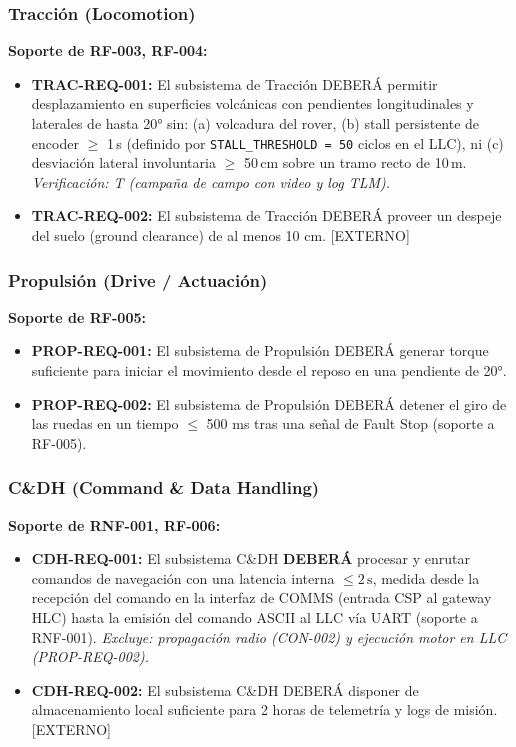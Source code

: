 \subsubsection{Tracción (Locomotion)}
\textbf{Soporte de RF-003, RF-004:}
\begin{itemize}
    \item \textbf{TRAC-REQ-001:} El subsistema de Tracción DEBERÁ permitir desplazamiento en superficies volcánicas con pendientes longitudinales y laterales de hasta 20° sin: (a) volcadura del rover, (b) stall persistente de encoder $\ge$ 1\,s (definido por \texttt{STALL\_THRESHOLD = 50} ciclos en el LLC), ni (c) desviación lateral involuntaria $\ge$ 50\,cm sobre un tramo recto de 10\,m. \emph{Verificación: T (campaña de campo con video y log TLM).}
    \item \textbf{TRAC-REQ-002:} El subsistema de Tracción DEBERÁ proveer un despeje del suelo (ground clearance) de al menos 10 cm. [EXTERNO]
\end{itemize}

\subsubsection{Propulsión (Drive / Actuación)}
\textbf{Soporte de RF-005:}
\begin{itemize}
    \item \textbf{PROP-REQ-001:} El subsistema de Propulsión DEBERÁ generar torque suficiente para iniciar el movimiento desde el reposo en una pendiente de 20°.
    \item \textbf{PROP-REQ-002:} El subsistema de Propulsión DEBERÁ detener el giro de las ruedas en un tiempo $\le$ 500 ms tras una señal de Fault Stop (soporte a RF-005).
\end{itemize}

\subsubsection{C\&DH (Command \& Data Handling)}
\textbf{Soporte de RNF-001, RF-006:}
\begin{itemize}
    \item \textbf{CDH-REQ-001:} El subsistema C\&DH \textbf{DEBERÁ} procesar y enrutar comandos de navegación con una latencia interna $\le 2\,\mathrm{s}$, medida desde la recepción del comando en la interfaz de COMMS (entrada CSP al gateway HLC) hasta la emisión del comando ASCII al LLC vía UART (soporte a RNF-001). \emph{Excluye: propagación radio (CON-002) y ejecución motor en LLC (PROP-REQ-002).}
    \item \textbf{CDH-REQ-002:} El subsistema C\&DH DEBERÁ disponer de almacenamiento local suficiente para 2 horas de telemetría y logs de misión. [EXTERNO]
\end{itemize}

